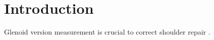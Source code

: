 \section{Introduction}
\label{sec:introduction}
Glenoid version measurement is crucial to correct shoulder repair \cite{PMID:33330245}.
